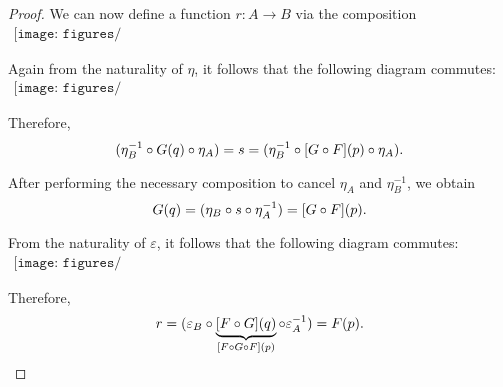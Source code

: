 \begin{proof}
  We can now define a function \( r: A \to B \) via the composition
  \begin{equation}\label{eq:thm:equivalence_induces_fully_faithful_and_essentially_surjective_functor/fullness/def}
    \begin{aligned}
      \texttt{[image: figures/thm\_\_category\_equivalence\_is\_fully\_faithful\_and\_essentially\_surjective.pdf]}
    \end{aligned}
  \end{equation}

  Again from the naturality of \( \eta \), it follows that the following diagram commutes:
  \begin{equation}\label{eq:thm:equivalence_induces_fully_faithful_and_essentially_surjective_functor/fullness/nat_eta}
    \begin{aligned}
      \texttt{[image: figures/thm\_\_category\_equivalence\_is\_fully\_faithful\_and\_essentially\_surjective.pdf]}
    \end{aligned}
  \end{equation}

  Therefore,
  \begin{equation*}
    (\eta_B^{-1} \bincirc G(q) \bincirc \eta_A) = s = (\eta_B^{-1} \bincirc [G \bincirc F](p) \bincirc \eta_A).
  \end{equation*}

  After performing the necessary composition to cancel \( \eta_A \) and \( \eta_B^{-1} \), we obtain
  \begin{equation*}
     G(q) = (\eta_B \bincirc s \bincirc \eta_A^{-1}) = [G \bincirc F](p).
  \end{equation*}

  From the naturality of \( \varepsilon \), it follows that the following diagram commutes:
  \begin{equation}\label{eq:thm:equivalence_induces_fully_faithful_and_essentially_surjective_functor/fullness/nat_varepsilon}
    \begin{aligned}
      \texttt{[image: figures/thm\_\_category\_equivalence\_is\_fully\_faithful\_and\_essentially\_surjective.pdf]}
    \end{aligned}
  \end{equation}

  Therefore,
  \begin{equation*}
   r = (\varepsilon_B \bincirc \underbrace{[F \bincirc G](q)}_{[F \bincirc G \bincirc F](p)} \bincirc \varepsilon_A^{-1}) = F(p).
  \end{equation*}
\end{proof}


